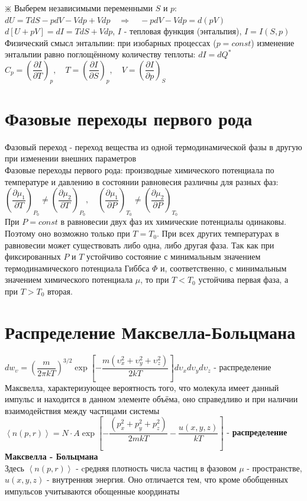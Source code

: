 \begin{multicols*}{2}
		$\divideontimes$ Выберем независимыми переменными $S$ и $p$:\\
		$dU = TdS - pdV - Vdp + Vdp \quad \Rightarrow \quad - pdV - Vdp = d(pV)$\\
		$d\left[U + pV\right] = dI = T dS + V dp$, \quad $I$ - тепловая функция (энтальпия), \quad $I = I(S, p)$\\
		Физический смысл энтальпии: при изобарных процессах ($p = const$) изменение энтальпии равно поглощённому количеству теплоты: $dI = dQ^*$\\
		$C_p = \left(\dfrac{\partial I}{\partial T}\right)_p, \quad T = \left(\dfrac{\partial I}{\partial S}\right)_p, \quad V = \left(\dfrac{\partial I}{\partial p}\right)_S$\\
 
		\section{Фазовые переходы первого рода}
		Фазовый переход - переход вещества из одной термодинамической фазы в другую при изменении внешних параметров\\
		Фазовые переходы первого рода: производные химического потенциала по температуре и давлению в состоянии равновесия различны для разных фаз:\\
		$\left(\dfrac{\partial \mu_1}{\partial T}\right)_{P_0} \neq \left(\dfrac{\partial \mu_2}{\partial T}\right)_{P_0}, \quad \left(\dfrac{\partial \mu_1}{\partial P}\right)_{T_0} \neq \left(\dfrac{\partial \mu_2}{\partial P}\right)_{T_0}$\\
		При $P=const$ в равновесии двух фаз их химические потенциалы одинаковы. Поэтому оно возможно только при $T = T_0$. При всех других температурах в равновесии может существовать либо одна, либо другая фаза. Так как при фиксированных $P$ и $T$ устойчиво состояние с минимальным значением термодинамического потенциала Гиббса $\Phi$ и, соответственно, с минимальным значением химического потенциала $\mu$, то при $T < T_0$ устойчива первая фаза, а при $T > T_0$ вторая.

		\section{Распределение Максвелла-Больцмана}
		$dw_{\upsilon} =\left(\dfrac{m}{2\pi kT}\right)^{3/2}\exp\left[-\dfrac{m(\upsilon^2_x + \upsilon^2_y +\upsilon^2_z)}{2kT}\right]d\upsilon_x d\upsilon_y d\upsilon_z$ - распределение Максвелла, характеризующее вероятность того, что молекула имеет данный импульс и находится в данном элементе объёма, оно справедливо и при наличии взаимодействия между частицами системы \\
		$\left\langle n(p, r)\right\rangle = N\cdot A\exp \left[-\dfrac{(p^2_x + p^2_y + p^2_z)}{2mkT} - \dfrac{u(x,y,z)}{kT}\right]$ - \textbf{распределение Максвелла - Больцмана}\\
		Здесь $\left\langle n(p, r)\right\rangle$ - cредняя плотность числа частиц в фазовом $\mu$ - пространстве, $u(x,y,z)$ - внутренняя энергия. Оно отличается тем, что кроме обобщенных импульсов учитываются обощенные координаты\\


\end{multicols*}

